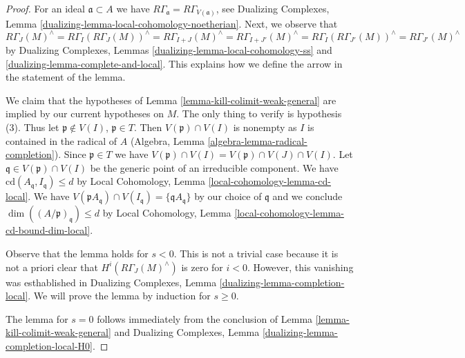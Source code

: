 \begin{proof}
For an ideal $\mathfrak a \subset A$ we have
$R\Gamma_\mathfrak a = R\Gamma_{V(\mathfrak a)}$, see
Dualizing Complexes, Lemma \ref{dualizing-lemma-local-cohomology-noetherian}.
Next, we observe that
$$
R\Gamma_J(M)^\wedge =
R\Gamma_I(R\Gamma_J(M))^\wedge =
R\Gamma_{I + J}(M)^\wedge =
R\Gamma_{I + J'}(M)^\wedge =
R\Gamma_I(R\Gamma_{J'}(M))^\wedge =
R\Gamma_{J'}(M)^\wedge
$$
by Dualizing Complexes, Lemmas \ref{dualizing-lemma-local-cohomology-ss} and
\ref{dualizing-lemma-complete-and-local}.
This explains how we define the arrow in the statement of the lemma.

\medskip\noindent
We claim that the hypotheses of Lemma \ref{lemma-kill-colimit-weak-general}
are implied by our current hypotheses on $M$.
The only thing to verify is hypothesis (3).
Thus let $\mathfrak p \not \in V(I)$, $\mathfrak p \in T$.
Then $V(\mathfrak p) \cap V(I)$ is nonempty as $I$ is
contained in the radical of $A$
(Algebra, Lemma \ref{algebra-lemma-radical-completion}).
Since $\mathfrak p \in T$ we have
$V(\mathfrak p) \cap V(I) = V(\mathfrak p) \cap V(J) \cap V(I)$.
Let $\mathfrak q \in V(\mathfrak p) \cap V(I)$ be the
generic point of an irreducible component.
We have $\text{cd}(A_\mathfrak q, I_\mathfrak q) \leq d$
by Local Cohomology, Lemma \ref{local-cohomology-lemma-cd-local}.
We have $V(\mathfrak pA_\mathfrak q) \cap V(I_\mathfrak q) =
\{\mathfrak qA_\mathfrak q\}$ by our choice of $\mathfrak q$
and we conclude $\dim((A/\mathfrak p)_\mathfrak q) \leq d$
by Local Cohomology, Lemma \ref{local-cohomology-lemma-cd-bound-dim-local}.

\medskip\noindent
Observe that the lemma holds for $s < 0$. This is not a trivial case because
it is not a priori clear that $H^i(R\Gamma_J(M)^\wedge)$
is zero for $i < 0$. However, this vanishing was esthablished in
Dualizing Complexes, Lemma \ref{dualizing-lemma-completion-local}.
We will prove the lemma by induction for $s \geq 0$.

\medskip\noindent
The lemma for $s = 0$ follows immediately from
the conclusion of Lemma \ref{lemma-kill-colimit-weak-general}
and Dualizing Complexes, Lemma \ref{dualizing-lemma-completion-local-H0}.


\end{proof}
